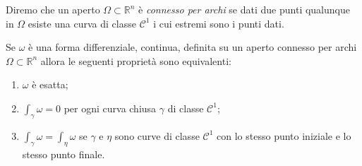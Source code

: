 \documentclass[italian,a4paper]{scrartcl}
\newcommand{\RR}{{\mathbb R}}
\begin{document}
Diremo che un aperto $\Omega\subset \RR^n$ è \emph{connesso per archi}
se dati due punti qualunque in $\Omega$ esiste una curva di classe
$\mathcal C^1$ i cui estremi sono i punti dati.

\begin{theorem}
Se $\omega$ è una forma differenziale, continua, definita su un aperto
connesso per archi $\Omega\subset \RR^n$ allora le seguenti proprietà
sono equivalenti:
\begin{enumerate}
\item $\omega$ è esatta;
\item $\int_\gamma \omega = 0$ per ogni curva chiusa $\gamma$ di
  classe $\mathcal C^1$;
\item $\int_\gamma \omega = \int_\eta \omega$ se $\gamma$ e $\eta$
  sono curve di classe $\mathcal C^1$ con lo stesso punto iniziale e lo
  stesso punto finale.
\end{enumerate}
\end{theorem}
\end{document}
